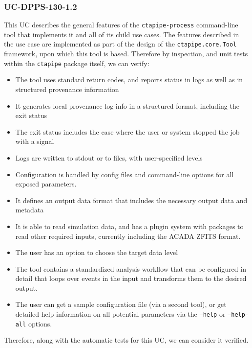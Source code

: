 \subsubsection{UC-DPPS-130-1.2}

This UC describes the general features of the \texttt{ctapipe-process}
command-line tool that implements it and all of its child use cases. The
features described in the use case are implemented as part of the design of the
\texttt{ctapipe.core.Tool} framework, upon which this tool is based. Therefore
by inspection, and unit tests within the \texttt{ctapipe} package itself, we can
verify:

\begin{itemize}
  \item The tool uses standard return codes, and reports status in logs as well as in structured provenance information
  \item It generates local provenance log info in a structured format, including the exit status
  \item The exit status includes the case where the user or system stopped the job with a signal
  \item Logs are written to stdout or to files, with user-specified levels
  \item Configuration is handled by config files and command-line options for
        all exposed parameters.
  \item It defines an output data format that includes the necessary output data and metadata
  \item It is able to read simulation data, and has a plugin system  with packages to read other required inputs, currently including the ACADA ZFITS format.
  \item The user has an option to choose the target data level
  \item The tool contains a standardized analysis workflow that can be configured in detail that loops over events in the input and transforms them to the desired output.
  \item The user can get a sample configuration file (via a second tool), or get detailed help information on all potential parameters via the \texttt{--help} or \texttt{--help-all} options.
\end{itemize}

Therefore, along with the automatic tests for this UC, we can consider it verified.
